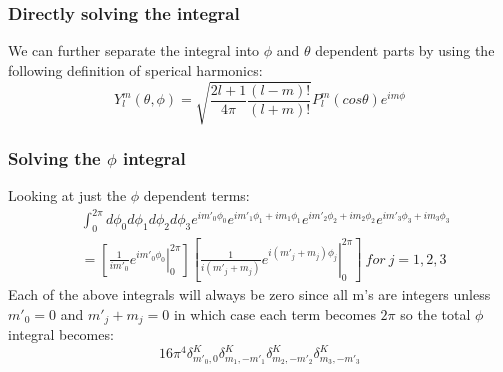 \documentclass{beamer}
\begin{document}
    \begin{frame}
        \frametitle{Directly solving the integral}
        We can further separate the integral into $\phi$ and $\theta$ dependent parts by using the following definition of 
        sperical harmonics:
        \begin{equation*}
            Y_l^m (\theta, \phi) = \sqrt{\frac{2l + 1}{4 \pi} \frac{(l-m)!}{(l+m)!}} P_l^m (cos \theta) e^{im\phi}
        \end{equation*}
    \end{frame}

    \begin{frame}
        \frametitle{Solving the $\phi$ integral}
        Looking at just the $\phi$ dependent terms:
        \begin{align*}
            &\int_0^{2\pi} d\phi_0 d\phi_1 d\phi_2 d\phi_3 e^{im'_0\phi_0}e^{im'_1\phi_1 + im_1\phi_1}e^{im'_2\phi_2 + im_2\phi_2}e^{im'_3\phi_3 + im_3\phi_3}\\
            &= \left[\left.\frac{1}{im'_0}e^{im'_0\phi_0}\right|_0^{2\pi}\right] \left[\left.\frac{1}{i(m'_j + m_j)}e^{i(m'_j + m_j)\phi_j}\right|_0^{2\pi}\right]\ for\ j = 1,2,3
        \end{align*}
        Each of the above integrals will always be zero since all m's are integers unless $m'_0 = 0$ and $m'_j + m_j = 0$ in which case
        each term becomes $2\pi$ so the total $\phi$ integral becomes:
        \begin{equation*}
            16\pi^4 \delta^K_{m'_0,0} \delta^K_{m_1,-m'_1} \delta^K_{m_2,-m'_2} \delta^K_{m_3,-m'_3}
        \end{equation*}
    \end{frame}
\end{document}
